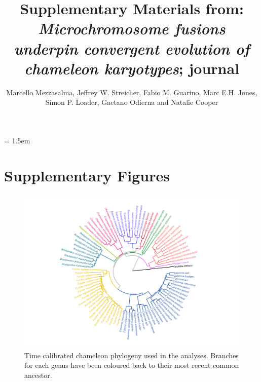 \documentclass[a4paper, 12pt]{article}
\title{Supplementary Materials from: \textit{Microchromosome fusions underpin convergent evolution of chameleon karyotypes}; journal}
\author{Marcello Mezzasalma, Jeffrey W. Streicher, Fabio M. Guarino, Marc E.H. Jones,\\ 
Simon P. Loader, Gaetano Odierna and Natalie Cooper}
\date{}
\begin{document}
\maketitle

\tableofcontents

\parindent = 1.5em
\addtolength{\parskip}{.3em}


\newpage
\section{Supplementary Figures}

\begin{figure}[H]
 \centering
  \includegraphics[width = \linewidth]{figures/trees-genera-colour.png}
  \caption{Time calibrated chameleon phylogeny used in the analyses. 
  Branches for each genus have been coloured back to their most recent common ancestor.
}
  \label{fig-phylo}
\end{figure}
\end{document}
